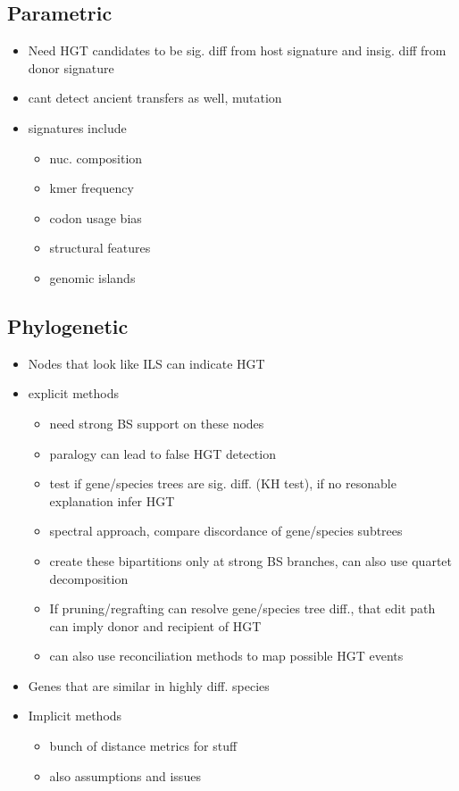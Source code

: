 \documentclass[10pt,letter]{article}
\begin{document}
\subsection*{Parametric}
\begin{itemize}
    \item Need HGT candidates to be sig. diff from host signature and insig. diff from donor signature
    \item cant detect ancient transfers as well, mutation
    \item signatures include
    \begin{itemize}
        \item nuc. composition
        \item kmer frequency
        \item codon usage bias
        \item structural features
        \item genomic islands
    \end{itemize}
\end{itemize}
\subsection*{Phylogenetic}
\begin{itemize}
    \item Nodes that look like ILS can indicate HGT
    \item explicit methods
    \begin{itemize}
        \item need strong BS support on these nodes
        \item paralogy can lead to false HGT detection
        \item test if gene/species trees are sig. diff. (KH test), if no resonable explanation infer HGT
        \item spectral approach, compare discordance of gene/species subtrees
        \item create these bipartitions only at strong BS branches, can also use quartet decomposition
        \item If pruning/regrafting can resolve gene/species tree diff., that edit path can imply donor and recipient of HGT
        \item can also use reconciliation methods to map possible HGT events
    \end{itemize}
    \item Genes that are similar in highly diff. species
    \item Implicit methods
    \begin{itemize}
        \item bunch of distance metrics for stuff
        \item also assumptions and issues
    \end{itemize}
\end{itemize}
\end{document}
